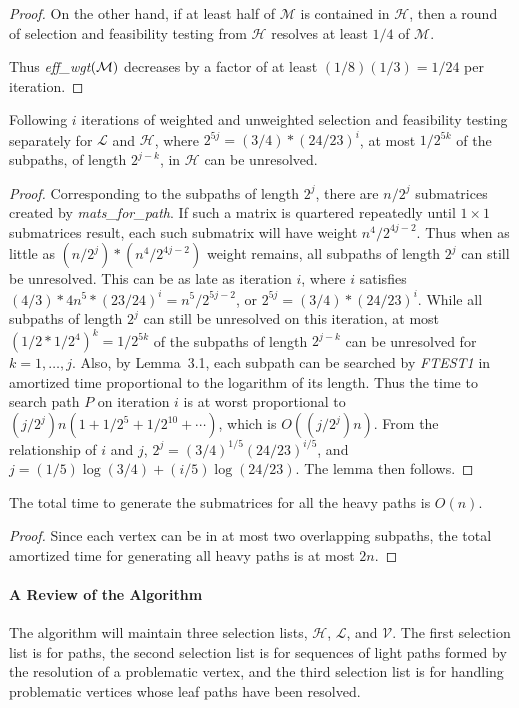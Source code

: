 \documentclass[12pt]{article}
\begin{document}
\begin{spacing}{1.5}
\begin{proof}
On the other hand, if at least half of $\mathcal{M}$ is contained in $\mathcal{H}$, then a round of selection and feasibility testing 
from $\mathcal{H}$ resolves at least $1/4$ of $\mathcal{M}$.

Thus {\it eff\_wgt}$(\cal M )$
decreases by a factor of at least $(1/8)(1/3) = 1/24$ per iteration.
\end{proof}

\begin{lemma}
Following $i$ iterations of weighted and unweighted selection and feasibility testing separately for $\mathcal{L}$ and $\mathcal{H}$, where $2^{5j}=(3/4)*(24/23)^i$, at most $1/2^{5k}$ of the subpaths, of length $2^{j-k}$, in $\mathcal{H}$ can be unresolved.
\end{lemma}
\begin{proof}
Corresponding to the subpaths of length $2^j$,
there are $n/2^j$ submatrices created by {\it mats\_for\_path}.
If such a matrix is quartered repeatedly until $1 \times 1$ submatrices result,
each such submatrix will have weight $n^4/2^{4j-2}$.
Thus when as little as $(n/2^j)*(n^4/2^{4j-2})$ weight remains,
all subpaths of length $2^j$ can still be unresolved.
This can be as late as iteration $i$,
where $i$ satisfies
$(4/3)*4n^5*(23/24)^i = n^5/2^{5j-2}$,
or $2^{5j}=(3/4)*(24/23)^i$.
While all subpaths of length $2^j$ can still be unresolved on this iteration,
at most $(1/2*1/2^4)^k = 1/2^{5k}$ of the subpaths of length $2^{j-k}$
can be unresolved for $k= 1, \ldots, j$.
Also, by Lemma~3.1, each subpath can be searched by {\it FTEST1}
in amortized time proportional to the logarithm of its length.
Thus the time to search path $P$ on iteration $i$ is at worst proportional to
$(j/2^j)n(1 + 1/2^5 + 1/2^{10} + \cdots )$,
which is $O((j/2^j)n)$.
From the relationship of $i$ and $j$,
$2^j = (3/4)^{1/5}(24/23)^{i/5}$,
and $j = (1/5)\log(3/4) + (i/5)\log (24/23)$.
The lemma then follows.
\end{proof}

\begin{lemma}
The total time to generate the submatrices for all the heavy paths is $O(n)$.
\end{lemma}
\begin{proof}
Since each vertex can be in at most two overlapping subpaths, the total amortized time for generating all heavy paths is at most $2n$.
\end{proof}

\paragraph{A Review of the Algorithm}
The algorithm will maintain three selection lists, $\mathcal{H}$, $\mathcal{L}$, and $\mathcal{V}$. The first selection list is for paths, the second selection list is for sequences of light paths formed by the resolution of a problematic vertex, and the third selection list is for handling problematic vertices whose leaf paths have been resolved.


\end{spacing}
\end{document}
